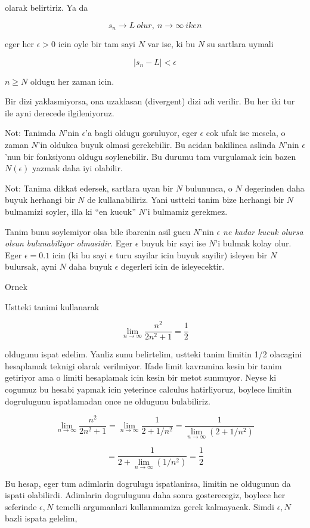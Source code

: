 \documentclass[12pt,fleqn]{article}
\begin{document}
olarak belirtiriz. Ya da

\[ s_n \to L \ olur, \ n \to \infty \ iken \]

eger her $\epsilon > 0$ icin oyle bir tam sayi $N$ var ise, ki bu $N$ su
sartlara uymali

\[ |s_n - L| < \epsilon  \]

$n \ge N$ oldugu her zaman icin. 

Bir dizi yaklasmiyorsa, ona uzaklasan (divergent) dizi adi verilir. Bu her
iki tur ile ayni derecede ilgileniyoruz. 

Not: Tanimda $N$'nin $\epsilon$'a bagli oldugu goruluyor, eger $\epsilon$
cok ufak ise mesela, o zaman $N$'in oldukca buyuk olmasi
gerekebilir. Bu acidan bakilinca aslinda $N$'nin $\epsilon$'nun bir
fonksiyonu oldugu soylenebilir. Bu durumu tam vurgulamak icin bazen
$N(\epsilon)$ yazmak daha iyi olabilir. 

Not: Tanima dikkat edersek, sartlara uyan bir $N$ bulununca, o $N$
degerinden daha buyuk herhangi bir $N$ de kullanabiliriz. Yani ustteki
tanim bize herhangi bir $N$ bulmamizi soyler, illa ki ``en kucuk'' $N$'i
bulmamiz gerekmez. 

Tanim bunu soylemiyor olsa bile ibarenin asil gucu $N$'nin {\em $\epsilon$
  ne kadar kucuk olursa olsun bulunabiliyor olmasidir}. Eger $\epsilon$
buyuk bir sayi ise $N$'i bulmak kolay olur. Eger $\epsilon = 0.1$ icin (ki
bu sayi $\epsilon$ turu sayilar icin buyuk sayilir) isleyen bir $N$
bulursak, ayni $N$ daha buyuk  $\epsilon$ degerleri icin de isleyecektir. 

Ornek 

Ustteki tanimi kullanarak 

\[ \lim_{n \to \infty } \frac{n^2}{2n^2 + 1} = \frac{1}{2} \]

oldugunu ispat edelim. Yanliz sunu belirtelim, ustteki tanim limitin 1/2
olacagini hesaplamak teknigi olarak verilmiyor. Ifade limit kavramina kesin
bir tanim getiriyor ama o limiti hesaplamak icin kesin bir metot
sunmuyor. Neyse ki cogumuz bu hesabi yapmak icin yeterince calculus
hatirliyoruz, boylece limitin dogrulugunu ispatlamadan once ne oldugunu
bulabiliriz.

\[ \lim_{n \to \infty } \frac{n^2}{2n^2 + 1}  =
\lim_{n \to \infty } \frac{1}{2 + 1/n^2} =
\frac{1}{\lim_{n \to \infty }(2 + 1/n^2)} 
\]

\[ = \frac{1}{2 + \lim_{n \to \infty }(1/n^2)}  = \frac{1}{2} \]

Bu hesap, eger tum adimlarin dogrulugu ispatlanirsa, limitin ne oldugunun
da ispati olabilirdi. Adimlarin dogrulugunu daha sonra gosterecegiz,
boylece her seferinde $\epsilon,N$ temelli argumanlari kullanmamiza gerek
kalmayacak. Simdi  $\epsilon,N$ bazli ispata gelelim, 
\end{document}
